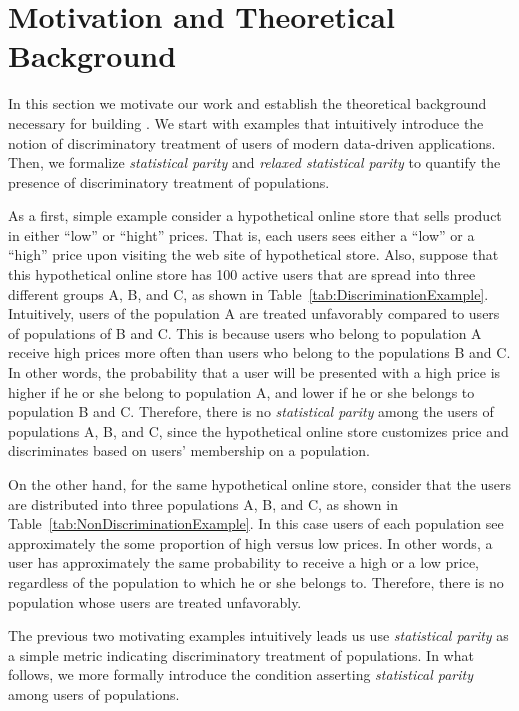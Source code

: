 \section{Motivation and Theoretical Background}
\label{sect:motivation}

In this section we motivate our work and establish the theoretical
background necessary for building \sysname. We start with examples
that intuitively  introduce the notion of discriminatory treatment
of users of modern data-driven applications. Then, we formalize 
{\em statistical parity} and {\em relaxed statistical parity} to
quantify the presence of discriminatory treatment of populations.

As a first, simple example consider a hypothetical  online store that
sells product in either ``low'' or ``hight'' prices. That is, each
users sees either a ``low'' or a ``high'' price upon visiting the web
site of hypothetical store. Also, suppose that this hypothetical online
store has 100 active users that are spread into three different groups
A, B, and C, as shown in Table~\ref{tab:DiscriminationExample}.
Intuitively, users of
the population A are treated unfavorably compared to users of populations
of B and C. This is because users who belong to population A receive high
prices more often than users who belong to the populations B and C. In other
words, the probability that a user will be presented with a high price is
higher if he or she belong to population A, and lower if he or she belongs to
population B and C. Therefore, there is no {\em statistical parity} among the
users of populations A, B, and C, since the hypothetical online store
customizes price and discriminates based on users' membership on a population.

On the other hand, for the same hypothetical online store, consider
that the users are distributed into three populations A, B, and C, as
shown in Table~\ref{tab:NonDiscriminationExample}. In this case
users of each population see approximately the some proportion of high versus
low prices. In other words, a user has approximately the same probability to
receive a high or a low price, regardless of the population to which he or she
belongs to. Therefore, there is no population whose users are treated
unfavorably.

The previous two motivating examples intuitively leads us use {\em statistical
parity} as a simple metric indicating discriminatory treatment of populations.
In what follows, we more formally introduce the condition asserting
{\em statistical parity} among users of populations.


